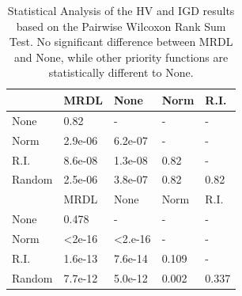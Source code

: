 \begin{table}[!t]
	\begin{tabular}{lllll}
		\hline
		\rowcolor[gray]{.7} \multicolumn{1}{|l|}{HV}  & \multicolumn{1}{|l|}{MRDL} & \multicolumn{1}{l|}{None} & \multicolumn{1}{l|}{Norm} & \multicolumn{1}{l|}{R.I.} \\ \hline \hline \hline
		None                      & 0.82                      & -                         & -                         & -                         \\
		\rowcolor[gray]{.95}Norm                      & 2.9e-06                   & 6.2e-07                   & -                         & -                         \\
		R.I.                      & 8.6e-08                   & 1.3e-08                   & 0.82                      & -                         \\
		\rowcolor[gray]{.95}Random                    & 2.5e-06                   & 3.8e-07                   & 0.82                      & 0.82                      \\ \hline \hline \hline
		\rowcolor[gray]{.7} \multicolumn{1}{|l|}{IGD} & \multicolumn{1}{|l|}{MRDL} & \multicolumn{1}{l|}{None} & \multicolumn{1}{l|}{Norm} & \multicolumn{1}{l|}{R.I.} \\ \hline \hline \hline
		None                      & 0.478                     & -                         & -                         & -                         \\
		\rowcolor[gray]{.95}Norm                      & \textless 2e-16           & \textless 2.e-16          & -                         & -                         \\
		R.I.                      & 1.6e-13                   & 7.6e-14                   & 0.109                     & -                         \\
		\rowcolor[gray]{.95}Random                    & 7.7e-12                   & 5.0e-12                   & 0.002                     & 0.337
	\end{tabular}
	\caption{Statistical Analysis of the HV and IGD results based on the Pairwise Wilcoxon Rank Sum Test. No significant difference between MRDL and None, while other priority functions are statistically different to None.\\
	}
	\label{statistics}
\end{table}



